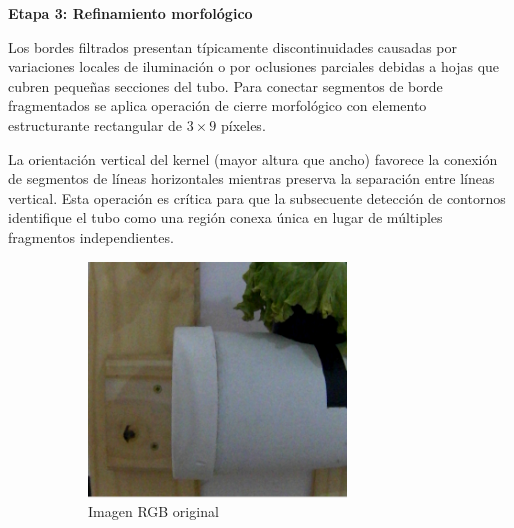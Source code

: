 \textbf{Etapa 3: Refinamiento morfológico}

Los bordes filtrados presentan típicamente discontinuidades causadas por variaciones locales de iluminación o por oclusiones parciales debidas a hojas que cubren pequeñas secciones del tubo. Para conectar segmentos de borde fragmentados se aplica operación de cierre morfológico con elemento estructurante rectangular de $3 \times 9$ píxeles.

La orientación vertical del kernel (mayor altura que ancho) favorece la conexión de segmentos de líneas horizontales mientras preserva la separación entre líneas vertical. Esta operación es crítica para que la subsecuente detección de contornos identifique el tubo como una región conexa única en lugar de múltiples fragmentos independientes.

\begin{figure}[H]
\centering
\begin{subfigure}[b]{0.48\textwidth}
    \centering
    \includegraphics[width=\textwidth]{imagenes/detector_tubos_1_original.png}
    \caption{Imagen RGB original}
\end{subfigure}
\hfill
\begin{subfigure}[b]{0.48\textwidth}
    \centering

\end{subfigure}
\end{figure}
